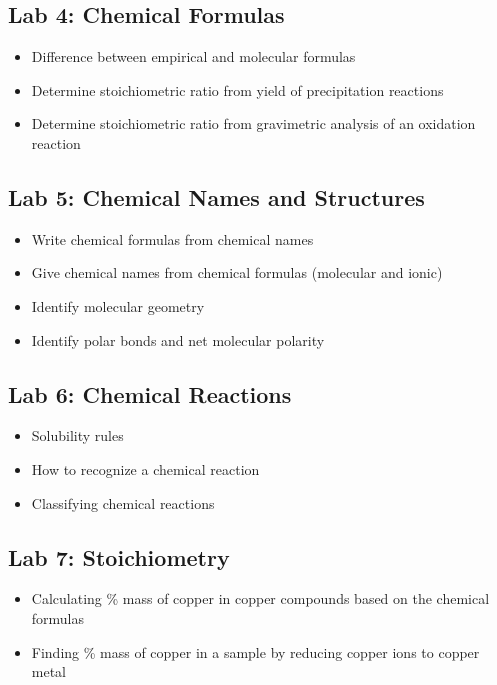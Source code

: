 \documentclass[12pt, letterpaper]{memoir}
\begin{document}
	\subsection*{Lab 4: Chemical Formulas}
	\begin{itemize}
		\item Difference between empirical and molecular formulas
		\item Determine stoichiometric ratio from yield of precipitation reactions
		\item Determine stoichiometric ratio from gravimetric analysis of an oxidation reaction
	\end{itemize}
	
	\subsection*{Lab 5: Chemical Names and Structures}
	\begin{itemize}
		\item Write chemical formulas from chemical names
		\item Give chemical names from chemical formulas (molecular and ionic)
		\item Identify molecular geometry
		\item Identify polar bonds and net molecular polarity		
	\end{itemize}
	
	\subsection*{Lab 6: Chemical Reactions}
	\begin{itemize}
		\item Solubility rules
		\item How to recognize a chemical reaction
		\item Classifying chemical reactions
	\end{itemize}
	
	\subsection*{Lab 7: Stoichiometry}
	\begin{itemize}
		\item Calculating \% mass of copper in copper compounds based on the chemical formulas
		\item Finding \% mass of copper in a sample by reducing copper ions to copper metal
	\end{itemize}
	
\end{document}
